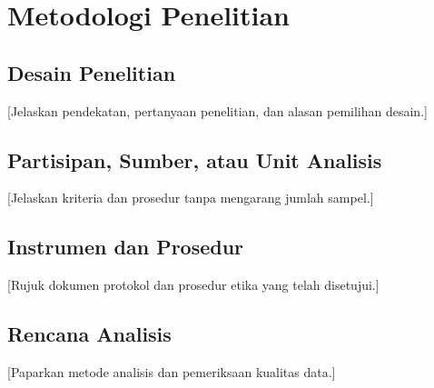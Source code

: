 \chapter{Metodologi Penelitian}
\section{Desain Penelitian}
[Jelaskan pendekatan, pertanyaan penelitian, dan alasan pemilihan desain.]

\section{Partisipan, Sumber, atau Unit Analisis}
[Jelaskan kriteria dan prosedur tanpa mengarang jumlah sampel.]

\section{Instrumen dan Prosedur}
[Rujuk dokumen protokol dan prosedur etika yang telah disetujui.]

\section{Rencana Analisis}
[Paparkan metode analisis dan pemeriksaan kualitas data.]
